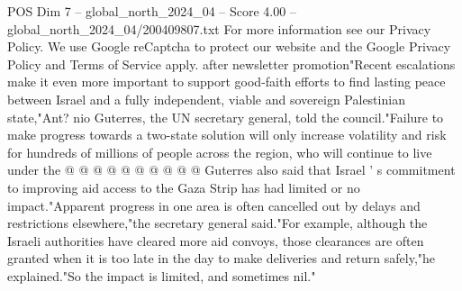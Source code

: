 \begin{textsample}{POS Dim 7 – global\_north\_2024\_04 – Score 4.00 – global\_north\_2024\_04/200409807.txt}
For more information see our Privacy Policy.
We use Google reCaptcha to protect our website and the Google Privacy Policy and Terms of Service apply. after newsletter promotion"Recent escalations make it even more important to support good-faith efforts to find lasting peace between Israel and a fully independent, viable and sovereign Palestinian state,"Ant? nio Guterres, the UN secretary general, told the council."Failure to make progress towards a two-state solution will only increase volatility and risk for hundreds of millions of people across the region, who will continue to live under the @ @ @ @ @ @ @ @ @ @ Guterres also said that Israel ' s commitment to improving aid access to the Gaza Strip has had limited or no impact."Apparent progress in one area is often cancelled out by delays and restrictions elsewhere,"the secretary general said."For example, although the Israeli authorities have cleared more aid convoys, those clearances are often granted when it is too late in the day to make deliveries and return safely,"he explained."So the impact is limited, and sometimes nil."

\end{textsample}
